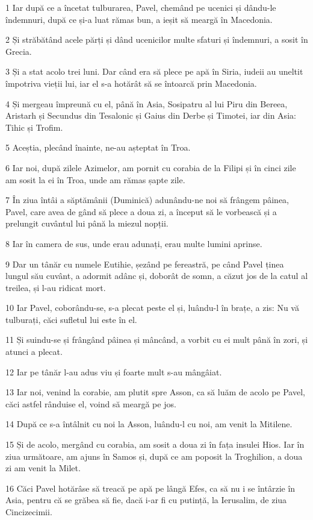 \par 1 Iar după ce a încetat tulburarea, Pavel, chemând pe ucenici și dându-le îndemnuri, după ce și-a luat rămas bun, a ieșit să meargă în Macedonia.
\par 2 Și străbătând acele părți și dând ucenicilor multe sfaturi și îndemnuri, a sosit în Grecia.
\par 3 Și a stat acolo trei luni. Dar când era să plece pe apă în Siria, iudeii au uneltit împotriva vieții lui, iar el s-a hotărât să se întoarcă prin Macedonia.
\par 4 Și mergeau împreună cu el, până în Asia, Sosipatru al lui Piru din Bereea, Aristarh și Secundus din Tesalonic și Gaius din Derbe și Timotei, iar din Asia: Tihic și Trofim.
\par 5 Aceștia, plecând înainte, ne-au așteptat în Troa.
\par 6 Iar noi, după zilele Azimelor, am pornit cu corabia de la Filipi și în cinci zile am sosit la ei în Troa, unde am rămas șapte zile.
\par 7 În ziua întâi a săptămânii (Duminică) adunându-ne noi să frângem pâinea, Pavel, care avea de gând să plece a doua zi, a început să le vorbească și a prelungit cuvântul lui până la miezul nopții.
\par 8 Iar în camera de sus, unde erau adunați, erau multe lumini aprinse.
\par 9 Dar un tânăr cu numele Eutihie, șezând pe fereastră, pe când Pavel ținea lungul său cuvânt, a adormit adânc și, doborât de somn, a căzut jos de la catul al treilea, și l-au ridicat mort.
\par 10 Iar Pavel, coborându-se, s-a plecat peste el și, luându-l în brațe, a zis: Nu vă tulburați, căci sufletul lui este în el.
\par 11 Și suindu-se și frângând pâinea și mâncând, a vorbit cu ei mult până în zori, și atunci a plecat.
\par 12 Iar pe tânăr l-au adus viu și foarte mult s-au mângâiat.
\par 13 Iar noi, venind la corabie, am plutit spre Asson, ca să luăm de acolo pe Pavel, căci astfel rânduise el, voind să meargă pe jos.
\par 14 După ce s-a întâlnit cu noi la Asson, luându-l cu noi, am venit la Mitilene.
\par 15 Și de acolo, mergând cu corabia, am sosit a doua zi în fața insulei Hios. Iar în ziua următoare, am ajuns în Samos și, după ce am poposit la Troghilion, a doua zi am venit la Milet.
\par 16 Căci Pavel hotărâse să treacă pe apă pe lângă Efes, ca să nu i se întârzie în Asia, pentru că se grăbea să fie, dacă i-ar fi cu putință, la Ierusalim, de ziua Cincizecimii.
